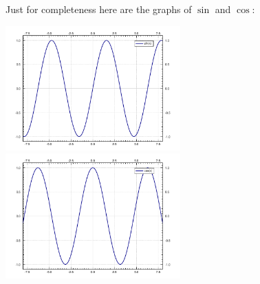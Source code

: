 \documentclass[10pt,aspectratio=169]{beamer}
\begin{document}
\begin{frame}
Just for completeness here are the graphs of $\sin$ and $\cos$:

\begin{center}
\includegraphics[width=2.65in]{figures/sin.pdf}\quad%
\includegraphics[width=2.65in]{figures/cos.pdf}
\end{center}

\end{frame}
\end{document}
